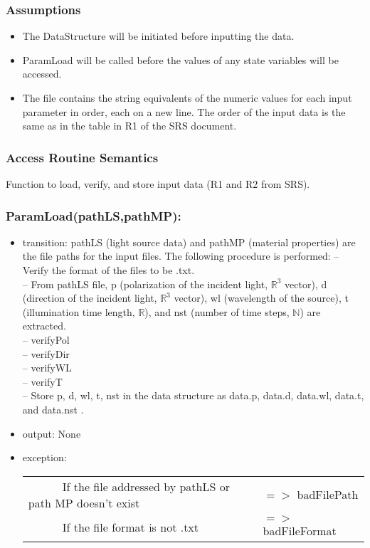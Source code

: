 \documentclass[12pt, titlepage]{article}
\begin{document}
\subsubsection{Assumptions}
\begin{itemize}
	\item The DataStructure will be initiated before inputting the data.
	
	\item ParamLoad will be called before the values of any state variables will be accessed.
	
	\item The file contains the string equivalents of the numeric values for each input parameter
	in order, each on a new line. The order of the input data is the same as in the table in R1 of the SRS document. 
	
\end{itemize}

\subsubsection{Access Routine Semantics}

Function to load, verify, and store input data (R1 and R2 from SRS).

\subsubsection*{ParamLoad(pathLS,pathMP):}
\begin{itemize}
	\item transition: pathLS (light source data) and pathMP (material properties) are the file paths for the input files. The following procedure is performed:
	\subitem -- Verify the format of the files to be .txt.\\
	\subitem -- From pathLS file, p (polarization of the incident light, $\mathbb{R}^3$ vector), d (direction of the incident light, $\mathbb{R}^3$ vector), wl (wavelength of the source), t (illumination time length, $\mathbb{R}$), and nst (number of time steps, $\mathbb{N}$) are extracted.\\
	\subitem -- verifyPol\\
	\subitem -- verifyDir\\
	\subitem -- verifyWL\\
	\subitem -- verifyT\\
	\subitem -- Store p, d, wl, t, nst in the data structure as data.p, data.d, data.wl, data.t, and data.nst .
	\item output: None
	
	\item exception: 
	\noindent \begin{longtable*}[l]{l l}
	\ \ \ \ \ \ If the file addressed by pathLS or path MP doesn't exist & $=>$ badFilePath\\
	\ \ \ \ \ \ If the file format is not .txt & $=>$ badFileFormat\\
	\end{longtable*}

\end{itemize}
\end{document}
